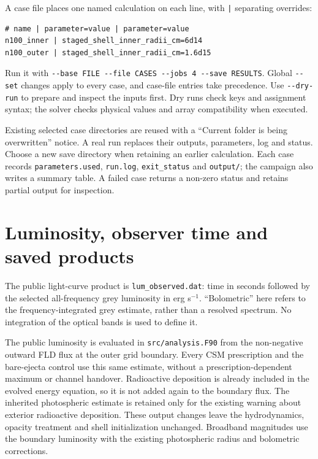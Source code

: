 \documentclass[11pt,a4paper]{article}
\newcommand{\code}[1]{\nolinkurl{#1}}
\begin{document}
A case file places one named calculation on each line, with \code{|} separating overrides:
\begin{lstlisting}
# name | parameter=value | parameter=value
n100_inner | staged_shell_inner_radii_cm=6d14
n100_outer | staged_shell_inner_radii_cm=1.6d15
\end{lstlisting}
Run it with \code{--base FILE --file CASES --jobs 4 --save RESULTS}. Global \code{--set} changes apply to every case, and case-file entries take precedence. Use \code{--dry-run} to prepare and inspect the inputs first. Dry runs check keys and assignment syntax; the solver checks physical values and array compatibility when executed.

Existing selected case directories are reused with a ``Current folder is being overwritten'' notice. A real run replaces their outputs, parameters, log and status. Choose a new save directory when retaining an earlier calculation. Each case records \code{parameters.used}, \code{run.log}, \code{exit_status} and \code{output/}; the campaign also writes a summary table. A failed case returns a non-zero status and retains partial output for inspection.

\section{Luminosity, observer time and saved products}
The public light-curve product is \code{lum_observed.dat}: time in seconds followed by the selected all-frequency grey luminosity in erg s$^{-1}$. ``Bolometric'' here refers to the frequency-integrated grey estimate, rather than a resolved spectrum. No integration of the optical bands is used to define it.

The public luminosity is evaluated in \code{src/analysis.F90} from the non-negative outward FLD flux at the outer grid boundary. Every CSM prescription and the bare-ejecta control use this same estimate, without a prescription-dependent maximum or channel handover. Radioactive deposition is already included in the evolved energy equation, so it is not added again to the boundary flux. The inherited photospheric estimate is retained only for the existing warning about exterior radioactive deposition. These output changes leave the hydrodynamics, opacity treatment and shell initialization unchanged. Broadband magnitudes use the boundary luminosity with the existing photospheric radius and bolometric corrections.
\end{document}
